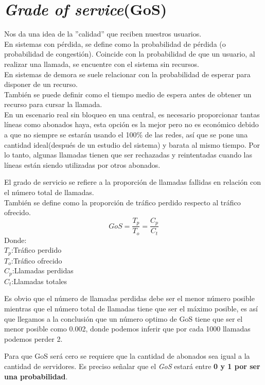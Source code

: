 \documentclass[
	11pt, %
	fleqn, %
	a4paper, %
]{LegrandOrangeBook}
\begin{document}
\section{\textit{Grade of service}(GoS)}
Nos da una idea de la ''calidad'' que reciben nuestros usuarios.\\
En sistemas con pérdida, se define como la probabilidad de pérdida (o probabilidad de congestión). Coincide con la probabilidad de que un usuario, al realizar una llamada, se encuentre con el sistema sin recursos.\\
En sistemas de demora se suele relacionar con la probabilidad de esperar para disponer de un recurso.\\
También se puede definir como el tiempo medio de espera antes de obtener un recurso para cursar la llamada.\\
En un escenario real sin bloqueo en una central, es necesario proporcionar tantas líneas como abonados haya, esta opción es la mejor pero no es económico debido a que no siempre se estarán usando el 100\% de las redes, así que se pone una cantidad ideal(después de un estudio del sistema) y barata al mismo tiempo. Por lo tanto, algunas llamadas tienen que ser rechazadas y reintentadas cuando las líneas están siendo utilizadas por otros abonados.
\begin{definition}
El grado de servicio se refiere a la proporción de llamadas fallidas en relación con el número total de llamadas.\\
También se define como la proporción de tráfico perdido respecto al tráfico ofrecido.
\begin{equation}
GoS=\frac{T_p}{T_o}=\frac{C_p}{C_t}
\end{equation}
Donde:\\$T_p$:Tráfico perdido\\$T_o$:Tráfico ofrecido\\$C_p$:Llamadas perdidas\\$C_t$:Llamadas totales
\end{definition}
\begin{remark}
Es obvio que el número de llamadas perdidas debe ser el menor número posible mientras que el número total de llamadas tiene que ser el máximo posible, es así que llegamos a la conclusión que un número optimo de GoS tiene que ser el menor posible como 0.002, donde podemos inferir que por cada 1000 llamadas podemos perder 2.
\end{remark}
\begin{remark}
Para que GoS será cero se requiere que la cantidad de abonados sea igual a la cantidad de servidores. Es preciso señalar que el \textit{GoS} estará entre \textbf{0 y 1 por ser una probabilidad}.
\end{remark}
\end{document}
